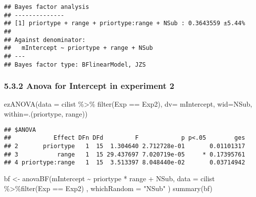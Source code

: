 \documentclass[
]{article}
\newenvironment{Shaded}{\begin{snugshade}}{\end{snugshade}}
\newcommand{\AttributeTok}[1]{\textcolor[rgb]{0.77,0.63,0.00}{#1}}
\newcommand{\FunctionTok}[1]{\textcolor[rgb]{0.00,0.00,0.00}{#1}}
\newcommand{\NormalTok}[1]{#1}
\newcommand{\OtherTok}[1]{\textcolor[rgb]{0.56,0.35,0.01}{#1}}
\newcommand{\SpecialCharTok}[1]{\textcolor[rgb]{0.00,0.00,0.00}{#1}}
\newcommand{\StringTok}[1]{\textcolor[rgb]{0.31,0.60,0.02}{#1}}
\begin{document}
\begin{verbatim}
## Bayes factor analysis
## --------------
## [1] priortype + range + priortype:range + NSub : 0.3643559 ±5.44%
## 
## Against denominator:
##   mIntercept ~ priortype + range + NSub 
## ---
## Bayes factor type: BFlinearModel, JZS
\end{verbatim}

\hypertarget{anova-for-intercept-in-experiment-2}{%
\subsubsection{5.3.2 Anova for Intercept in experiment
2}\label{anova-for-intercept-in-experiment-2}}

\begin{Shaded}
\begin{Highlighting}[]
\FunctionTok{ezANOVA}\NormalTok{(}\AttributeTok{data =}\NormalTok{ cilist }\SpecialCharTok{\%\textgreater{}\%} \FunctionTok{filter}\NormalTok{(Exp }\SpecialCharTok{==} \StringTok{\textquotesingle{}Exp2\textquotesingle{}}\NormalTok{), }\AttributeTok{dv=}\NormalTok{ mIntercept, }\AttributeTok{wid=}\NormalTok{NSub, }\AttributeTok{within=}\NormalTok{.(priortype, range))}
\end{Highlighting}
\end{Shaded}

\begin{verbatim}
## $ANOVA
##            Effect DFn DFd         F            p p<.05        ges
## 2       priortype   1  15  1.304640 2.712728e-01       0.01101317
## 3           range   1  15 29.437697 7.020719e-05     * 0.17395761
## 4 priortype:range   1  15  3.513397 8.048440e-02       0.03714942
\end{verbatim}

\begin{Shaded}
\begin{Highlighting}[]
\NormalTok{bf }\OtherTok{\textless{}{-}} \FunctionTok{anovaBF}\NormalTok{(mIntercept }\SpecialCharTok{\textasciitilde{}}\NormalTok{ priortype }\SpecialCharTok{*}\NormalTok{ range }\SpecialCharTok{+}\NormalTok{ NSub, }\AttributeTok{data =}\NormalTok{ cilist }\SpecialCharTok{\%\textgreater{}\%}\FunctionTok{filter}\NormalTok{(Exp }\SpecialCharTok{==} \StringTok{\textquotesingle{}Exp2\textquotesingle{}}\NormalTok{) , }\AttributeTok{whichRandom =} \StringTok{"NSub"}\NormalTok{ ) }
\FunctionTok{summary}\NormalTok{(bf)}
\end{Highlighting}
\end{Shaded}
\end{document}
